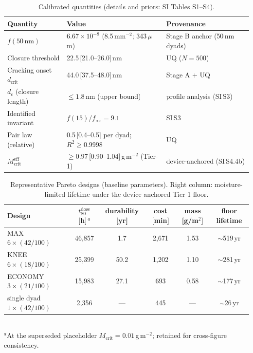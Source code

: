 \documentclass[11pt]{article}
\newcommand{\tdose}{t_{80}^{\mathrm{dose}}}
\begin{document}
\begin{table}[p]\centering\caption{Calibrated quantities (details and priors: SI Tables S1--S4).}\label{tab:cal}
\begin{tabular}{lll}\toprule
Quantity & Value & Provenance \\\midrule
$f(50\,\mathrm{nm})$ & $6.67\times10^{-8}$ (8.5\,mm$^{-2}$; 343\,$\mu$m) & Stage B anchor (50\,nm dyads) \\
Closure threshold & 22.5\,[21.0--26.0]\,nm & UQ ($N{=}500$) \\
Cracking onset $d_{\mathrm{crit}}$ & 44.0\,[37.5--48.0]\,nm & Stage A $+$ UQ \\
$d_c$ (closure length) & $\le1.8$\,nm (upper bound) & profile analysis (SI\,S3) \\
Identified invariant & $f(15)/f_{\mathrm{res}}=9.1$ & SI\,S3 \\
Pair law (relative) & 0.5\,[0.4--0.5] per dyad; $R^2\ge0.9998$ & UQ \\
$M_{\mathrm{crit}}^{\mathrm{eff}}$ & $\ge0.97$\,[0.90--1.04]\,g\,m$^{-2}$ (Tier-1) & device-anchored (SI\,S4.4b) \\\bottomrule
\end{tabular}\end{table}

\begin{table}[p]\centering\caption{Representative Pareto designs (baseline parameters). Right column: moisture-limited lifetime under the device-anchored Tier-1 floor.}\label{tab:reps}
\begin{tabular}{lccccc}\toprule
Design & $\tdose$ [h]$^{\,a}$ & durability [yr] & cost [min] & mass [g/m$^2$] & floor lifetime \\\midrule
MAX $6\times(42/100)$ & 46{,}857 & 1.7 & 2{,}671 & 1.53 & $\sim$519\,yr \\
KNEE $6\times(18/100)$ & 25{,}399 & 50.2 & 1{,}202 & 1.10 & $\sim$281\,yr \\
ECONOMY $3\times(21/100)$ & 15{,}983 & 27.1 & 693 & 0.58 & $\sim$177\,yr \\
single dyad $1\times(42/100)$ & 2{,}356 & --- & 445 & --- & $\sim$26\,yr \\\bottomrule
\end{tabular}\\[2pt]{\footnotesize $^a$At the superseded placeholder $M_{\mathrm{crit}}{=}0.01$\,g\,m$^{-2}$; retained for cross-figure consistency.}\end{table}
\end{document}

